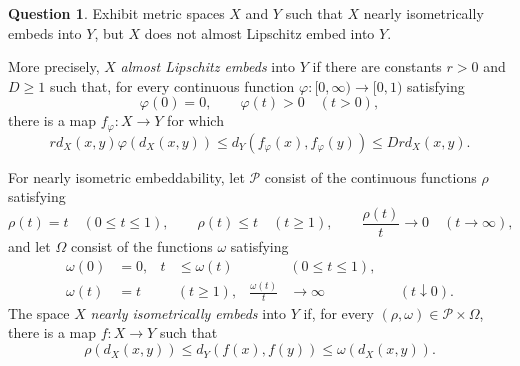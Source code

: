 \documentclass[11pt,reqno]{amsart}
\theoremstyle{plain}
\theoremstyle{definition}
\newtheorem{question}[question]{Question}
\begin{document}
\begin{question}
Exhibit metric spaces $X$ and $Y$ such that $X$ nearly isometrically embeds into $Y$, but $X$ does not almost Lipschitz embed into $Y$.

More precisely, $X$ \emph{almost Lipschitz embeds} into $Y$ if there are constants $r>0$ and $D\geq1$ such that, for every continuous function $\varphi\colon[0,\infty)\to[0,1)$ satisfying
\begin{equation*}
 \varphi(0)=0,
 \qquad \varphi(t)>0\quad(t>0),
\end{equation*}
there is a map $f_\varphi\colon X\to Y$ for which
\begin{equation*}
 r d_X(x,y)\varphi(d_X(x,y))
 \leq d_Y(f_\varphi(x),f_\varphi(y))
 \leq Drd_X(x,y).
\end{equation*}

For nearly isometric embeddability, let $\mathcal P$ consist of the continuous functions $\rho$ satisfying
\begin{equation*}
 \rho(t)=t\quad(0\leq t\leq1),
 \qquad \rho(t)\leq t\quad(t\geq1),
 \qquad \frac{\rho(t)}t\longrightarrow0\quad(t\to\infty),
\end{equation*}
and let $\Omega$ consist of the functions $\omega$ satisfying
\begin{equation*}
 \begin{aligned}
 \omega(0)&=0,
 & t&\leq\omega(t) &&(0\leq t\leq1),\\
 \omega(t)&=t &&(t\geq1),
 & \frac{\omega(t)}t&\longrightarrow\infty &&(t\downarrow0).
 \end{aligned}
\end{equation*}
The space $X$ \emph{nearly isometrically embeds} into $Y$ if, for every $(\rho,\omega)\in\mathcal P\times\Omega$, there is a map $f\colon X\to Y$ such that
\begin{equation*}
 \rho(d_X(x,y))\leq d_Y(f(x),f(y))\leq\omega(d_X(x,y)).
\end{equation*}
\end{question}
\end{document}
